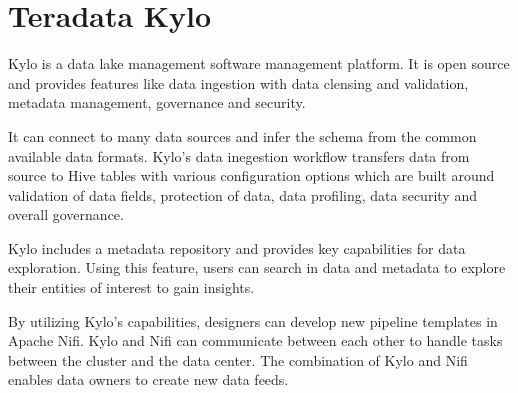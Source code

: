 \section{Teradata Kylo}

Kylo is a data lake management software management platform. It is open source
and provides features like data ingestion with data clensing and validation, 
metadata management, governance and security. 

It can connect to many data sources and infer the schema from the common
available data formats. Kylo's data inegestion workflow transfers
data from source to Hive tables with various configuration options
which are built around validation of data fields, protection of data,
data profiling, data security and overall governance.

Kylo includes a metadata repository and provides key capabilities for data 
exploration. Using this feature, users can search in data and metadata
to explore their entities of interest to gain insights. 


By utilizing Kylo's capabilities, designers can develop new
pipeline templates in Apache Nifi. Kylo and Nifi can communicate between 
each other to handle tasks between the cluster and the data center.
The combination of Kylo and Nifi enables data owners to create new
data feeds.

\cite{Teradata Kylo}

